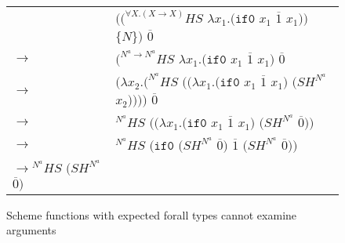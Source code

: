 \begin{figure}
\centering
\begin{tabular}{ll}
\vspace{5pt}

& $((^{\forall X.(X\rightarrow X)}HS$ $\lambda x_{1}.(\mathtt{if0}$ $x_{1}$ $\overline{1}$ $x_{1}))$ $\lbrace N\rbrace)$ $\overline{0}$ \\

\vspace{5pt}

$\rightarrow$ & $(^{N^{a}\rightarrow N^{a}}HS$ $\lambda x_{1}.(\mathtt{if0}$ $x_{1}$ $\overline{1}$ $x_{1})$ $\overline{0}$ \\

\vspace{5pt}

$\rightarrow$ & $(\lambda x_{2}.(^{N^{a}}HS$ $((\lambda x_{1}.(\mathtt{if0}$ $x_{1}$ $\overline{1}$ $x_{1})$ $(SH^{N^{a}}$ $x_{2}))))$ $\overline{0}$ \\

\vspace{5pt}

$\rightarrow$ & $^{N^{a}}HS$ $((\lambda x_{1}.(\mathtt{if0}$ $x_{1}$ $\overline{1}$ $x_{1})$ $(SH^{N^{a}}$ $\overline{0}))$ \\

\vspace{5pt}

$\rightarrow$ & $^{N^{a}}HS$ $(\mathtt{if0}$ $(SH^{N^{a}}$ $\overline{0})$ $\overline{1}$ $(SH^{N^{a}}$ $\overline{0}))$ \\

\vspace{5pt}

$\rightarrow{^{N^{a}}H}S$ $(SH^{N^{a}}$ $\overline{0})$
\end{tabular}
\caption{Scheme functions with expected forall types cannot examine arguments}
\label{parametricity-example-1}
\end{figure}